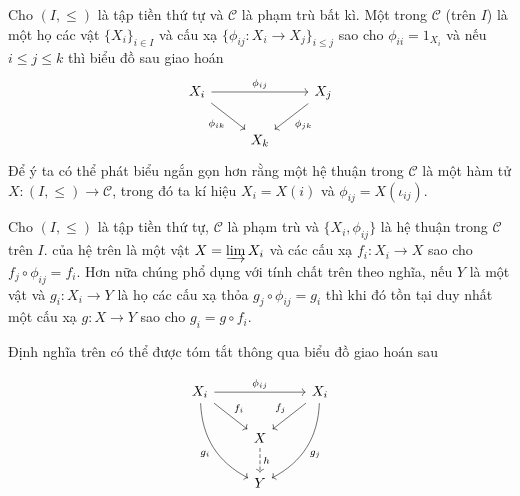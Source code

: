 \begin{define}
    Cho $(I,\leq)$ là tập tiền thứ tự và $\mathcal{C}$ là phạm trù bất kì. Một  trong $\mathcal{C}$ (trên $I$) là một họ các vật $\{X_i\}_{i \in I}$ và cấu xạ $\{ \phi_{ij}: X_i \rightarrow X_j \}_{i \leq j}$ sao cho $\phi_{ii} = 1_{X_i}$ và nếu $i \leq j \leq k$ thì biểu đồ sau giao hoán
    $$
        \begin{tikzcd}
            X_i \arrow[rr, "\phi_{ij}"] \arrow[rd, "\phi_{ik}"'] &     & X_j \arrow[ld, "\phi_{jk}"] \\
            & X_k &
        \end{tikzcd}
    $$
    Để ý ta có thể phát biểu ngắn gọn hơn rằng một hệ thuận trong $\mathcal{C}$ là một hàm tử $X: (I,\leq) \rightarrow \mathcal{C}$, trong đó ta kí hiệu $X_i = X(i)$ và $\phi_{ij} = X(\iota_{ij})$.
\end{define}

\begin{define}\label{def:direct-limit}
    Cho $(I,\leq)$ là tập tiền thứ tự, $\mathcal{C}$ là phạm trù và $\{X_i, \phi_{ij}\}$ là hệ thuận trong $\mathcal{C}$ trên $I$.  của hệ trên là một vật $X = \varinjlim X_i$ và các cấu xạ $f_i: X_i \rightarrow X$ sao cho $f_j \circ \phi_{ij} = f_i$. Hơn nữa chúng phổ dụng với tính chất trên theo nghĩa, nếu $Y$ là một vật và $g_i: X_i \rightarrow Y$ là họ các cấu xạ thỏa $g_j \circ \phi_{ij} = g_i$ thì khi đó tồn tại duy nhất một cấu xạ $g: X \rightarrow Y$ sao cho $g_i = g \circ f_i$.

    Định nghĩa trên có thể được tóm tắt thông qua biểu đồ giao hoán sau

    $$
        \begin{tikzcd}
            X_i \arrow[rr, "\phi_{ij}"] \arrow[rd, "f_i"] \arrow[rdd, "g_i"', bend right] &                          & X_i \arrow[ld, "f_j"'] \arrow[ldd, "g_j", bend left] \\
            & X \arrow[d, "h", dashed] &                                                      \\
            & Y                        &
        \end{tikzcd}
    $$
\end{define}